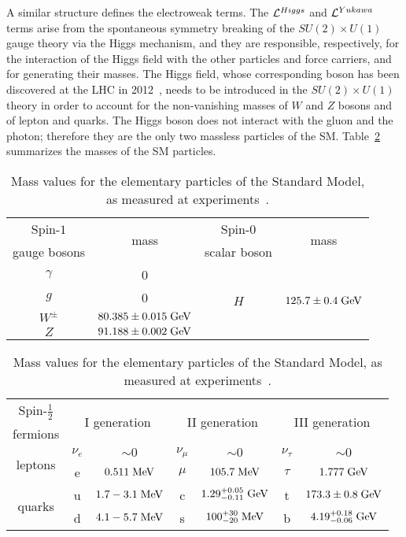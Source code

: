 A similar structure defines the electroweak terms.
The $\mathcal{L}{}^{Higgs}$ and $\mathcal{L}{}^{Yukawa}$ terms arise from the
spontaneous symmetry breaking of the $SU(2)\times{}U(1)$ gauge theory
via the Higgs mechanism, and they are responsible, respectively, for
the interaction of the Higgs field with the other particles and force
carriers, and for generating their masses.
The Higgs field, whose corresponding boson has been discovered at the
LHC in 2012~\cite{Aad:2012tfa,Chatrchyan:2012ufa},
needs to be introduced in
the $SU(2)\times{}U(1)$ theory in order to account for the
non-vanishing masses of $W$ and $Z$ bosons and of lepton and quarks.
The Higgs boson does not interact with the gluon and the photon;
therefore they are the only two massless particles of the
SM. Table~\ref{tab:smmasses} summarizes the masses of the SM particles.

\begin{table}\centering
  \begin{tabular}{cccc}\toprule
    Spin-$1$ & \multirow{2}{*}{mass} & Spin-0 & \multirow{2}{*}{mass}\\
    gauge bosons & & scalar boson & \\\midrule
    $\gamma$      & 0  & \multirow{4}{*}{$H$} & \multirow{4}{*}{$125.7\pm0.4\; \mathrm{GeV}$}\\
    $g$           & 0  & &                        \\
    $W^{\pm}$ & $ 80.385 \pm 0.015 \; \mathrm{GeV}$ & &\\
    $Z$       & $ 91.188 \pm 0.002 \; \mathrm{GeV}$ & &\\\bottomrule
  \end{tabular}
  \begin{tabular}{ccccccc}\toprule
    Spin-$\tfrac{1}{2}$ &  \multicolumn{2}{c}{\multirow{2}{*}{I generation}}
    &  \multicolumn{2}{c}{\multirow{2}{*}{II generation}}
    &  \multicolumn{2}{c}{\multirow{2}{*}{III generation}}\\
    fermions & & & & & \\\midrule
    \multirow{2}{*}{leptons} &
    $\nu_{e}$   & \small{$\sim 0$} &  
    $\nu_{\mu}$ & \small{$\sim 0$} &  
    $\nu_{\tau}$ & \small{$\sim 0$} \\
    &
    e            & \small{$0.511\; \mathrm{MeV}$}   &  
    $\mu$ & \small{$105.7\; \mathrm{MeV}$} &  
    $\tau$     & \small{$1.777\; \mathrm{GeV}$} \\
    \multirow{2}{*}{quarks} &
    u & \small{$1.7-3.1\; \mathrm{MeV}$}         &  
    c & \small{$1.29^{+0.05}_{-0.11}\; \mathrm{GeV}$}  &  
    t & \small{$173.3\pm0.8\; \mathrm{GeV}$}\\
    &
    d & \small{$4.1-5.7\; \mathrm{MeV}$} &  
    s & \small{$100^{+30}_{-20}\; \mathrm{MeV}$} &  
    b & \small{$4.19^{+0.18}_{-0.06}\; \mathrm{GeV}$} \\
\bottomrule
  \end{tabular}
  \caption{Mass values for the elementary particles of the Standard
    Model, as measured at experiments~\cite{Agashe:2014kda}.}
\label{tab:smmasses}
\end{table}
 
